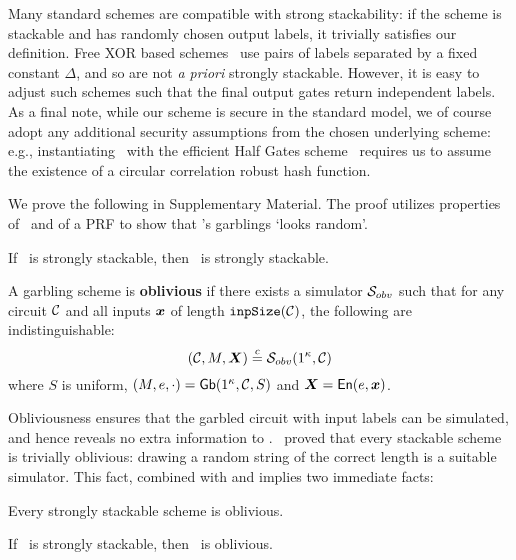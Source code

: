 Many standard schemes are compatible with strong stackability:
if the scheme is stackable and has randomly chosen output labels, it
trivially satisfies our definition.
%
Free XOR based schemes~\cite{ICALP:KolSch08} use
pairs of labels separated by a fixed constant $\Delta$, and so
are not \emph{a priori} strongly stackable. However, it is easy to adjust such
schemes such that the final output gates return independent labels.
%
As a final note, while our scheme is secure in the standard model, we
of course adopt any additional security assumptions from the chosen
underlying scheme: e.g., instantiating \ourschemelong\ with the efficient
Half Gates scheme~\cite{EC:ZahRosEva15} requires us to assume the
existence of a circular correlation robust hash function.

We prove the following in Supplementary Material. The proof
utilizes properties of \underscheme\ and of a PRF to show
that \ourschemelong's garblings `looks random'.

\begin{theorem}\label{thm:strongstack}
  If \underscheme\ is strongly stackable, then \ourschemelong\ is strongly stackable.
\end{theorem}
\begin{definition}[Obliviousness]\label{def:obliviousness}
  A garbling scheme is \textbf{oblivious} if there exists a
  simulator $\mathcal{S}_{obv}$ such that for
  any circuit $\mathcal C$
  and all inputs $\cirinp$ of length $\mathtt{inpSize}(\mathcal C)$,
  the following are indistinguishable:
  \[
    (\cir, \mat, \gcirinp) \indist \simulator_{obv}(1^\kappa, \cir)
  \]
  where
   $S$ is uniform,
   $(M, e, \cdot) = \textsf{Gb}(1^\kappa,\mathcal C,S)$
  and $\gcirinp = \gEn(e,\cirinp)$.
\end{definition}

Obliviousness ensures that the garbled circuit with input labels can be simulated, and
hence reveals no extra information to \E.
\HK\ proved that every stackable scheme is trivially oblivious:
drawing a random string of the correct length is a suitable simulator.
This fact, combined with  and
 implies two
immediate facts:
\begin{lemma}\label{lemma:obliviousness}
  Every strongly stackable scheme is oblivious.
\end{lemma}
\begin{theorem}\label{thm:oblivious}
  If \underscheme\ is strongly stackable, then \ourschemelong\ is oblivious.
\end{theorem}

